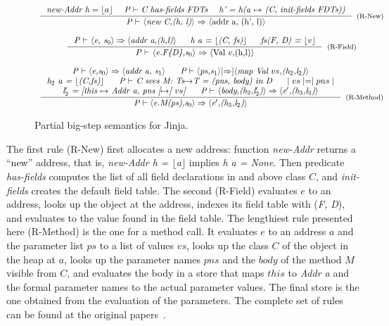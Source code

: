 \documentclass[tese,capa,english]{texufpel}
\begin{document}
\begin{figure}[!tb]
\[
\begin{array}{c} 
\inference{\textrm{\emph{new-Addr h}} = \lfloor a \rfloor \ \ \ \ \emph{P $\vdash$ C has-fields FDTs} \ \ \ \ \emph{h' = h(a $\mapsto$ (C, init-fields FDTs))}}
{\textrm{\emph{P $\vdash$ $\langle$new C,(h, l)$\rangle$} $\Rightarrow$ $\langle$addr a, (h', l)$\rangle$}}[(R-New)]
\\ \\
	
\inference{\textrm{\emph{P $\vdash$ $\langle$e, s$_0$$\rangle \Rightarrow \langle$addr a,(h,l)$\rangle$} \ \ \ \ \emph{h a = $\lfloor$(C, fs)$\rfloor$} \ \ \ \ \emph{fs(F, D) = $\lfloor v \rfloor$}}}
{\textrm{\emph{P $\vdash$ $\langle$e.F\{D\},s$_0 \rangle$} $\Rightarrow$ $\langle$Val $v$,(h,l)$\rangle$}}[(R-Field)]
\\ \\
	
\inference{\textrm{\emph{P $\vdash \langle$e,s$_0 \rangle \Rightarrow \langle$addr a, s$_1 \rangle$ \ \ \ \ P $\vdash \langle$ps,s$_1 \rangle [\Rightarrow] \langle$map Val $vs$,(h$_2$,l$_2$)$\rangle$}} \\ \textrm{\emph{h$_2$ a = $\lfloor$(C,fs)$\rfloor$ \ \ \ \ P $\vdash$ C sees M: Ts$\rightarrow$T = (pns, body) in D \ \ \ \ $\mid vs \mid = \mid pns \mid $}} \\ \textrm{\emph{l$_2'$ = [this $\mapsto$ Addr a, pns [$\mapsto$] $vs$] \ \ \ \ P $\vdash$ $\langle$body,(h$_2$,l$_2'$)$\rangle \Rightarrow \langle$e$'$,(h$_3$,l$_3$)$\rangle$}}}
{\textrm{\emph{P $\vdash \langle$e.M(ps),s$_0 \rangle \Rightarrow \langle$e$'$,(h$_3$,l$_2$)$\rangle$}}}[(R-Method)]
\\
\end{array}
\]
\vspace{-1ex}
\caption{Partial big-step semantics for Jinja.}
\label{fig:jinja-eval}
\vspace{-1ex}
\end{figure}

The first rule (R-New) first allocates a new address: function \emph{new-Addr} returns a ``new'' address, that is, \emph{new-Addr h = $\lfloor$a$\rfloor$} implies \emph{h a = None}. Then predicate \emph{has-fields} computes the list of all field declarations in and above class $C$, and \emph{init-fields} creates the default field table. The second (R-Field) evaluates $e$ to an address, looks up the object at the address, indexes its field table with (\emph{F, D}), and evaluates to the value found in the field table. The lengthiest rule presented here (R-Method) is the one for a method call. It evaluates $e$ to an address $a$ and the parameter list $ps$ to a list of values $vs$, looks up the class $C$ of the object in the heap at $a$, looks up the parameter names $pns$ and the $body$ of the method $M$ visible from $C$, and evaluates the body in a store that maps $this$ to \emph{Addr a} and the formal parameter names to the actual parameter values. The final store is the one obtained from the evaluation of the parameters. The complete set of rules can be found at the original papers~\cite{Nipkow03jinja:towards,Klein:2006:MMJ:1146809.1146811}.
\end{document}
